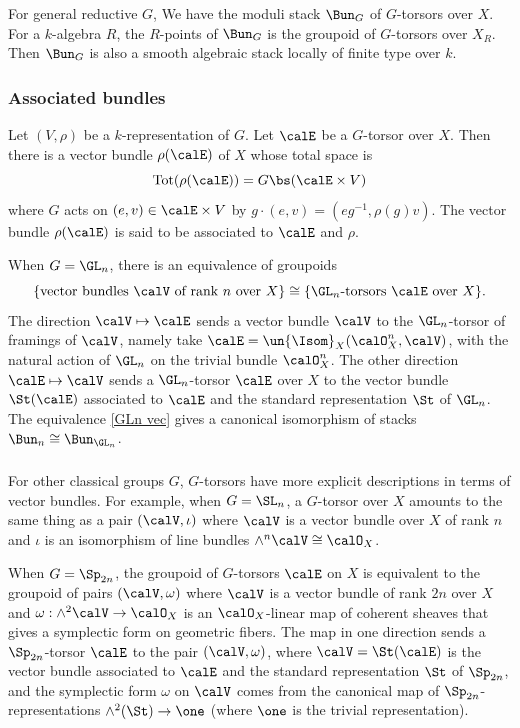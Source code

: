 For general reductive $G$, We have the moduli stack $\Bun_{G}$ of $G$-torsors over $X$. For a $k$-algebra $R$, the $R$-points of $\Bun_{G}$ is the groupoid of $G$-torsors over $X_{R}$. Then $\Bun_{G}$ is also a smooth algebraic stack locally of finite type over $k$.

\subsubsection{Associated bundles}\label{sss:ass bun} Let $(V,\rho)$ be a $k$-representation of $G$. Let $\calE$ be a $G$-torsor over $X$. Then there is a vector bundle $\rho(\calE)$ of $X$ whose total space is
\begin{equation*}
\textup{Tot}(\rho(\calE))=G\bs (\calE\times V)
\end{equation*}
where $G$ acts on $(e,v)\in\calE\times V$ by $g\cdot(e,v)=(eg^{-1}, \rho(g)v)$. The vector bundle $\rho(\calE)$ is said to be associated to $\calE$ and $\rho$.

When $G=\GL_{n}$, there is an equivalence of groupoids
\begin{equation}\label{GLn vec}
\{ \mbox{vector bundles $\calV$ of rank $n$ over $X$}\}\cong\{\mbox{$\GL_{n}$-torsors $\calE$ over $X$}\}. 
\end{equation}
The direction $\calV\mapsto\calE$ sends a vector bundle $\calV$ to the $\GL_{n}$-torsor of framings of $\calV$, namely take $\calE=\un{\Isom}_{X}(\calO^{n}_{X},\calV)$, with the natural action of $\GL_{n}$ on the trivial bundle $\calO^{n}_{X}$. The other direction $\calE\mapsto\calV$ sends a $\GL_{n}$-torsor $\calE$ over $X$ to the vector bundle $\St(\calE)$ associated to $\calE$ and the standard representation $\St$ of $\GL_{n}$. The equivalence \eqref{GLn vec} gives a canonical isomorphism of stacks $\Bun_{n}\cong\Bun_{\GL_{n}}$.


\subsubsection{}\label{sss:Bun Sp} For other classical groups $G$, $G$-torsors have more explicit descriptions in terms of vector bundles. For example, when $G=\SL_{n}$, a $G$-torsor over $X$ amounts to the same thing as a pair $(\calV,\iota)$ where $\calV$ is a vector bundle over $X$ of rank $n$ and $\iota$ is an isomorphism of line bundles $\wedge^{n}\calV\cong\calO_{X}$.


When $G=\Sp_{2n}$, the groupoid of $G$-torsors $\calE$ on $X$ is equivalent to the groupoid of pairs $(\calV,\omega)$ where $\calV$ is a vector bundle of rank $2n$ over $X$ and $\omega:\wedge^{2}\calV\to\calO_{X}$ is an $\calO_{X}$-linear map of coherent sheaves that gives a symplectic form on geometric fibers. The map in one direction sends a $\Sp_{2n}$-torsor $\calE$ to the pair $(\calV,\omega)$, where $\calV=\St(\calE)$ is the vector bundle associated to $\calE$ and the standard representation $\St$ of $\Sp_{2n}$, and the symplectic form $\omega$ on $\calV$ comes from the canonical map of $\Sp_{2n}$-representations $\wedge^{2}(\St)\to \one$ (where $\one$ is the trivial representation). 



